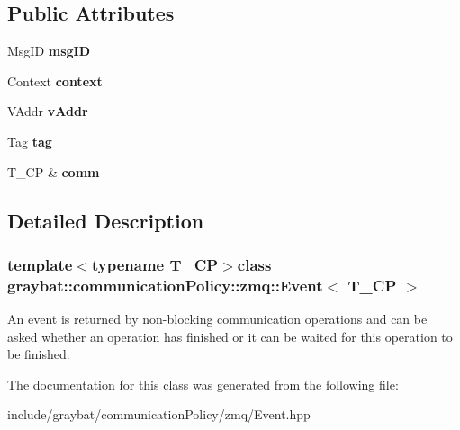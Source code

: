 \subsection*{Public Attributes}
\begin{DoxyCompactItemize}
\item 
\hypertarget{classgraybat_1_1communicationPolicy_1_1zmq_1_1Event_a130837551c5bc7dc99c5eb903af51800}{}Msg\+I\+D {\bfseries msg\+I\+D}\label{classgraybat_1_1communicationPolicy_1_1zmq_1_1Event_a130837551c5bc7dc99c5eb903af51800}

\item 
\hypertarget{classgraybat_1_1communicationPolicy_1_1zmq_1_1Event_ac1b5b3731edc737a711ecd8a39e9dbdb}{}Context {\bfseries context}\label{classgraybat_1_1communicationPolicy_1_1zmq_1_1Event_ac1b5b3731edc737a711ecd8a39e9dbdb}

\item 
\hypertarget{classgraybat_1_1communicationPolicy_1_1zmq_1_1Event_afcec320309760aecc842a3aaec4788db}{}V\+Addr {\bfseries v\+Addr}\label{classgraybat_1_1communicationPolicy_1_1zmq_1_1Event_afcec320309760aecc842a3aaec4788db}

\item 
\hypertarget{classgraybat_1_1communicationPolicy_1_1zmq_1_1Event_a10cce3d646304e6d88c16b7bbb3335b2}{}\hyperlink{structTag}{Tag} {\bfseries tag}\label{classgraybat_1_1communicationPolicy_1_1zmq_1_1Event_a10cce3d646304e6d88c16b7bbb3335b2}

\item 
\hypertarget{classgraybat_1_1communicationPolicy_1_1zmq_1_1Event_a8fa41e1ea108ad4cb994b0ca8681d4a8}{}T\+\_\+\+C\+P \& {\bfseries comm}\label{classgraybat_1_1communicationPolicy_1_1zmq_1_1Event_a8fa41e1ea108ad4cb994b0ca8681d4a8}

\end{DoxyCompactItemize}


\subsection{Detailed Description}
\subsubsection*{template$<$typename T\+\_\+\+C\+P$>$class graybat\+::communication\+Policy\+::zmq\+::\+Event$<$ T\+\_\+\+C\+P $>$}

An event is returned by non-\/blocking communication operations and can be asked whether an operation has finished or it can be waited for this operation to be finished. 

The documentation for this class was generated from the following file\+:\begin{DoxyCompactItemize}
\item 
include/graybat/communication\+Policy/zmq/Event.\+hpp\end{DoxyCompactItemize}
